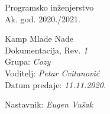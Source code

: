 \documentclass[12pt]{report}
\begin{document}
\begin{titlepage}
\begin{center}
\LARGE Programsko inženjerstvo\\
\large Ak. god. 2020./2021.\\


\huge Kamp Mlade Nade\\
\Large Dokumentacija, Rev. \textit{1}\\

\normalsize
Grupa: \textit{Cozy}\\
Voditelj: \textit{Petar Cvitanović}\\


Datum predaje: \textit{11.11.2020.}\\


Nastavnik: \textit{Eugen Vušak}\\

\end{center}


\end{titlepage}


\tableofcontents










\begingroup
\renewcommand*\listfigurename{Indeks slika i dijagrama}
\listoffigures
\endgroup
{}



\eject


\end{document}
